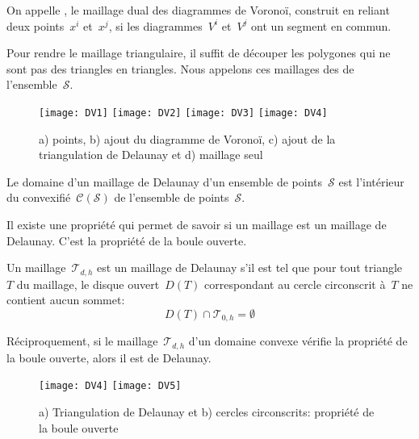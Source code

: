 \begin{definition}
On appelle , le maillage dual des diagrammes de Voronoï, construit en reliant deux points~$x^i$ et~$x^j$, si les diagrammes~$V^i$ et~$V^j$ ont un segment en commun.

Pour rendre le maillage triangulaire, il suffit de découper les polygones qui ne sont pas des triangles en triangles. Nous appelons ces maillages des  de l'ensemble~$\mathcal{S}$.
\end{definition}
\begin{figure}[htb]
\begin{center}
\texttt{[image: DV1]} \hspace{1em} \texttt{[image: DV2]} \hspace{1em} \texttt{[image: DV3]} \hspace{1em} \texttt{[image: DV4]}
\end{center}
\caption{a) points, b) ajout du diagramme de Voronoï, c) ajout de la triangulation de Delaunay et d) maillage seul}
\end{figure}

Le domaine d'un maillage de Delaunay d'un ensemble de points~$\mathcal{S}$ est l'intérieur du convexifié~$\mathcal{C(S)}$ de l'ensemble de points~$\mathcal{S}$.

\medskip
Il existe une propriété qui permet de savoir si un maillage est un maillage de Delaunay. C'est la propriété de la boule ouverte.
\begin{theoreme}
Un maillage~$\mathcal{T}_{d,h}$ est un maillage de Delaunay s'il est tel que pour tout triangle~$T$ du maillage, le disque ouvert~$D(T)$ correspondant au cercle circonscrit à~$T$ ne contient
aucun sommet:
\begin{equation}
D(T) \cap \mathcal{T}_{0,h} = \emptyset
\end{equation}

Réciproquement, si le maillage~$\mathcal{T}_{d,h}$ d'un domaine convexe vérifie la propriété de la boule ouverte, alors il est de Delaunay.
\end{theoreme}
\begin{figure}[htb]
\begin{center}
 \texttt{[image: DV4]} \hspace{1em} \texttt{[image: DV5]}
\end{center}
\caption{a) Triangulation de Delaunay et b) cercles circonscrits: propriété de la boule ouverte}
\end{figure}

